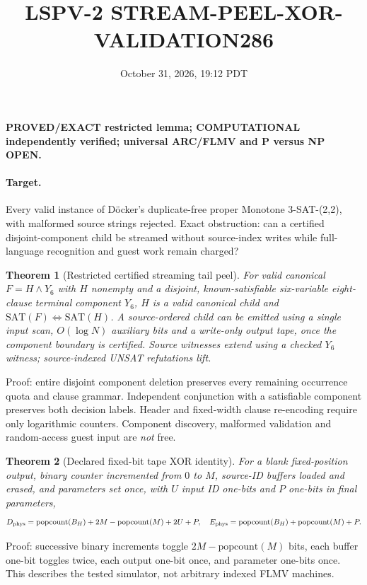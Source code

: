 \documentclass{article}
\title{LSPV-2 STREAM-PEEL-XOR-VALIDATION286}
\date{October 31, 2026, 19:12 PDT}
\newtheorem{theorem}{Theorem}
\begin{document}
\maketitle
\noindent \textbf{PROVED/EXACT restricted lemma; COMPUTATIONAL independently verified; universal ARC/FLMV and P versus NP OPEN.}

\paragraph{Target.} Every valid instance of D\"ocker's duplicate-free proper Monotone 3-SAT-(2,2), with malformed source strings rejected. Exact obstruction: can a certified disjoint-component child be streamed without source-index writes while full-language recognition and guest work remain charged?

\begin{theorem}[Restricted certified streaming tail peel]
For valid canonical $F=H\land Y_6$ with $H$ nonempty and a disjoint, known-satisfiable six-variable eight-clause terminal component $Y_6$, $H$ is a valid canonical child and $\mathrm{SAT}(F)\iff\mathrm{SAT}(H)$. A source-ordered child can be emitted using a single input scan, $O(\log N)$ auxiliary bits and a write-only output tape, once the component boundary is \emph{certified}. Source witnesses extend using a checked $Y_6$ witness; source-indexed UNSAT refutations lift.
\end{theorem}
\noindent Proof: entire disjoint component deletion preserves every remaining occurrence quota and clause grammar. Independent conjunction with a satisfiable component preserves both decision labels. Header and fixed-width clause re-encoding require only logarithmic counters. Component discovery, malformed validation and random-access guest input are \emph{not} free.

\begin{theorem}[Declared fixed-bit tape XOR identity]
For a blank fixed-position output, binary counter incremented from $0$ to $M$, source-ID buffers loaded and erased, and parameters set once, with $U$ input ID one-bits and $P$ one-bits in final parameters,
\[
D_{\rm phys}=\mathrm{popcount}(B_H)+2M-\mathrm{popcount}(M)+2U+P,\quad
E_{\rm phys}=\mathrm{popcount}(B_H)+\mathrm{popcount}(M)+P.
\]
\end{theorem}
\noindent Proof: successive binary increments toggle $2M-\mathrm{popcount}(M)$ bits, each buffer one-bit toggles twice, each output one-bit once, and parameter one-bits once. This describes the tested simulator, not arbitrary indexed FLMV machines.
\end{document}
